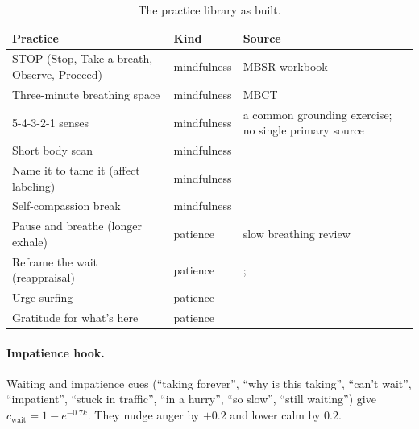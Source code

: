 \documentclass[10pt]{article}
\theoremstyle{definition}
\theoremstyle{remark}
\begin{document}
\begin{table}[ht]
\centering\small
\caption{The practice library as built.}
\label{tab:practices}
\begin{tabularx}{\textwidth}{@{}l l L@{}}
\toprule
Practice & Kind & Source \\
\midrule
STOP (Stop, Take a breath, Observe, Proceed) & mindfulness & MBSR workbook \citep{stahl2010} \\
Three-minute breathing space & mindfulness & MBCT \citep{segal2013} \\
5-4-3-2-1 senses & mindfulness & a common grounding exercise; no single primary source \\
Short body scan & mindfulness & \citet{kabatzinn1990} \\
Name it to tame it (affect labeling) & mindfulness & \citet{lieberman2007} \\
Self-compassion break & mindfulness & \citet{neff2003} \\
Pause and breathe (longer exhale) & patience & slow breathing review \citep{zaccaro2018} \\
Reframe the wait (reappraisal) & patience & \citet{gross1998}; \citet{schnitker2012} \\
Urge surfing & patience & \citet{bowen2009} \\
Gratitude for what's here & patience & \citet{emmons2003} \\
\bottomrule
\end{tabularx}
\end{table}

\paragraph{Impatience hook.} Waiting and impatience cues (``taking forever'', ``why is this taking'', ``can't wait'', ``impatient'', ``stuck in traffic'', ``in a hurry'', ``so slow'', ``still waiting'') give $c_{\mathrm{wait}}=1-e^{-0.7k}$. They nudge anger by $+0.2$ and lower calm by $0.2$.
\end{document}
